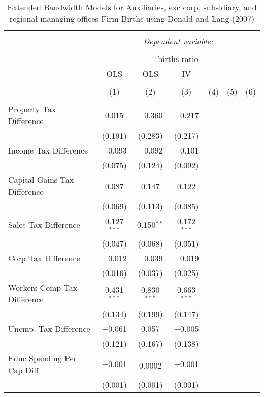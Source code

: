 
\begin{table}[!htbp] \centering 
  \caption{Extended Bandwidth Models for  Auxiliaries, exc corp, subsidiary, and regional managing offices Firm Births using Donald and Lang (2007)} 
  \label{} 
\begin{tabular}{@{\extracolsep{5pt}}lcccccc} 
\\[-1.8ex]\hline 
\hline \\[-1.8ex] 
 & \multicolumn{6}{c}{\textit{Dependent variable:}} \\ 
\cline{2-7} 
\\[-1.8ex] & \multicolumn{6}{c}{births ratio} \\ 
 & OLS & OLS & IV &  &  &  \\ 
\\[-1.8ex] & (1) & (2) & (3) & (4) & (5) & (6)\\ 
\hline \\[-1.8ex] 
 Property Tax Difference & 0.015 & $-$0.360 & $-$0.217 &  &  &  \\ 
  & (0.191) & (0.283) & (0.217) &  &  &  \\ 
  Income Tax Difference & $-$0.093 & $-$0.092 & $-$0.101 &  &  &  \\ 
  & (0.075) & (0.124) & (0.092) &  &  &  \\ 
  Capital Gains Tax Difference & 0.087 & 0.147 & 0.122 &  &  &  \\ 
  & (0.069) & (0.113) & (0.085) &  &  &  \\ 
  Sales Tax Difference & 0.127$^{***}$ & 0.150$^{**}$ & 0.172$^{***}$ &  &  &  \\ 
  & (0.047) & (0.068) & (0.051) &  &  &  \\ 
  Corp Tax Difference & $-$0.012 & $-$0.039 & $-$0.019 &  &  &  \\ 
  & (0.016) & (0.037) & (0.025) &  &  &  \\ 
  Workers Comp Tax Difference & 0.431$^{***}$ & 0.830$^{***}$ & 0.663$^{***}$ &  &  &  \\ 
  & (0.134) & (0.199) & (0.147) &  &  &  \\ 
  Unemp. Tax Difference & $-$0.061 & 0.057 & $-$0.005 &  &  &  \\ 
  & (0.121) & (0.167) & (0.138) &  &  &  \\ 
  Educ Spending Per Cap Diff & $-$0.001 & $-$0.0002 & $-$0.001 &  &  &  \\ 
  & (0.001) & (0.001) & (0.001) &  &  &  \\ 

\end{tabular}
\end{table}
